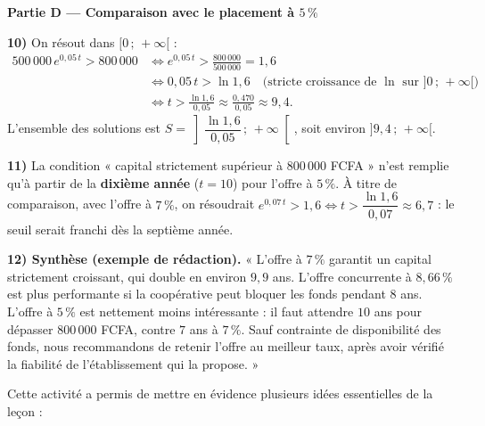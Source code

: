 \documentclass[11pt]{article}
\newcounter{popsec}
\newcounter{popsub}
\newcommand{\courssub}[1]{%
  \stepcounter{popsub}%
  \par\vspace{9pt}\noindent{\popxbold\fontsize{11.5}{13}\selectfont\color{popink}{\color{poporange}\thepopsec.\thepopsub}\hspace{6pt}#1}\par\nopagebreak\vspace{4pt}
}
\begin{document}
\begin{exoresolu}
\textbf{Partie D — Comparaison avec le placement à $5\,\%$}

\textbf{10)} On résout dans $[0\,;\,+\infty[$ :
\begin{align*}
500\,000\,e^{0,05\,t} > 800\,000 &\iff e^{0,05\,t} > \frac{800\,000}{500\,000} = 1,6 \\
&\iff 0,05\,t > \ln 1,6 \quad \text{(stricte croissance de } \ln \text{ sur } ]0\,;\,+\infty[\text{)} \\
&\iff t > \frac{\ln 1,6}{0,05} \approx \frac{0,470}{0,05} \approx 9,4.
\end{align*}
L'ensemble des solutions est $S = \left]\dfrac{\ln 1,6}{0,05}\,;\,+\infty\right[$, soit environ $]9,4\,;\,+\infty[$.

\textbf{11)} La condition « capital strictement supérieur à $800\,000$ FCFA » n'est remplie qu'à partir de la \textbf{dixième année} ($t = 10$) pour l'offre à $5\,\%$. À titre de comparaison, avec l'offre à $7\,\%$, on résoudrait $e^{0,07\,t} > 1,6 \iff t > \dfrac{\ln 1,6}{0,07} \approx 6,7$ : le seuil serait franchi dès la septième année.

\textbf{12) Synthèse (exemple de rédaction).} « L'offre à $7\,\%$ garantit un capital strictement croissant, qui double en environ $9,9$ ans. L'offre concurrente à $8,66\,\%$ est plus performante si la coopérative peut bloquer les fonds pendant $8$ ans. L'offre à $5\,\%$ est nettement moins intéressante : il faut attendre $10$ ans pour dépasser $800\,000$ FCFA, contre $7$ ans à $7\,\%$. Sauf contrainte de disponibilité des fonds, nous recommandons de retenir l'offre au meilleur taux, après avoir vérifié la fiabilité de l'établissement qui la propose. »
\end{exoresolu}

\courssub{Bilan de l'activité}

Cette activité a permis de mettre en évidence plusieurs idées essentielles de la leçon :
\end{document}
